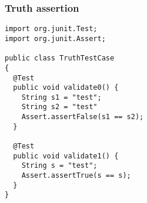\begin{frame}[fragile, hasprev=false, hasnext=false]
\frametitle{Truth assertion}
\label{example:junit-truth-assertion}

\begin{lstlisting}
import org.junit.Test;
import org.junit.Assert;

public class TruthTestCase
{
  @Test
  public void validate0() {
    String s1 = "test";
    String s2 = "test"
    Assert.assertFalse(s1 == s2);
  }

  @Test
  public void validate1() {
    String s = "test";
    Assert.assertTrue(s == s);
  }
}
\end{lstlisting}
\end{frame}